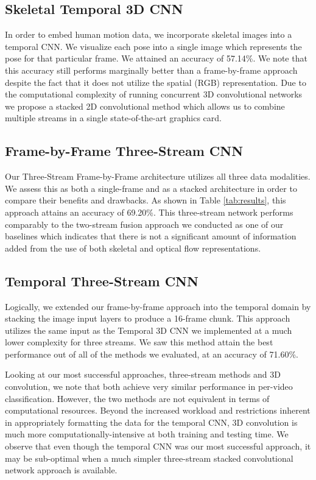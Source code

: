 \documentclass[10pt,twocolumn,letterpaper]{article}
\begin{document}
\subsection{Skeletal Temporal 3D CNN}
In order to embed human motion data, we incorporate skeletal images into a temporal CNN. We visualize each pose into a single image which represents the pose for that particular frame. We attained an accuracy of 57.14\%. We note that this accuracy still performs marginally better than a frame-by-frame approach despite the fact that it does not utilize the spatial (RGB) representation. Due to the computational complexity of running concurrent 3D convolutional networks we propose a stacked 2D convolutional method which allows us to combine multiple streams in a single state-of-the-art graphics card.

\subsection{Frame-by-Frame Three-Stream CNN}
Our Three-Stream Frame-by-Frame architecture utilizes all three data modalities. We assess this as both a single-frame and as a stacked architecture in order to compare their benefits and drawbacks. As shown in Table \ref{tab:results}, this approach attains an accuracy of 69.20\%. This three-stream network performs comparably to the two-stream fusion approach we conducted as one of our baselines which indicates that there is not a significant amount of information added from the use of both skeletal and optical flow representations. 

\subsection{Temporal Three-Stream CNN}
Logically, we extended our frame-by-frame approach into the temporal domain by stacking the image input layers to produce a 16-frame chunk. This approach utilizes the same input as the Temporal 3D CNN we implemented at a much lower complexity for three streams. We saw this method attain the best performance out of all of the methods we evaluated, at an accuracy of 71.60\%. 

Looking at our most successful approaches, three-stream methods and 3D convolution, we note that both achieve very similar performance in per-video classification. However, the two methods are not equivalent in terms of computational resources. Beyond the increased workload and restrictions inherent in appropriately formatting the data for the temporal CNN, 3D convolution is much more computationally-intensive at both training and testing time. We observe that even though the temporal CNN was our most successful approach, it may be sub-optimal when a much simpler three-stream stacked convolutional network approach is available.
\end{document}
